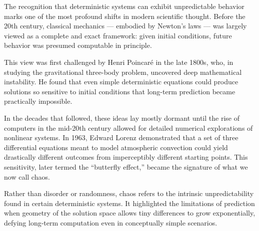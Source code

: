 \begin{historical}
The recognition that deterministic systems can exhibit unpredictable behavior marks one of the most profound shifts in modern scientific thought. Before the 20th century, classical mechanics — embodied by Newton’s laws — was largely viewed as a complete and exact framework: given initial conditions, future behavior was presumed computable in principle. 

This view was first challenged by Henri Poincaré in the late 1800s, who, in studying the gravitational three-body problem, uncovered deep mathematical instability. He found that even simple deterministic equations could produce solutions so sensitive to initial conditions that long-term prediction became practically impossible. 

In the decades that followed, these ideas lay mostly dormant until the rise of computers in the mid-20th century allowed for detailed numerical explorations of nonlinear systems. In 1963, Edward Lorenz demonstrated that a set of three differential equations meant to model atmospheric convection could yield drastically different outcomes from imperceptibly different starting points. This sensitivity, later termed the “butterfly effect,” became the signature of what we now call chaos. 

Rather than disorder or randomness, chaos refers to the intrinsic unpredictability found in certain deterministic systems. It highlighted the limitations of prediction when geometry of the solution space allows tiny differences to grow exponentially, defying long-term computation even in conceptually simple scenarios.
\end{historical}
